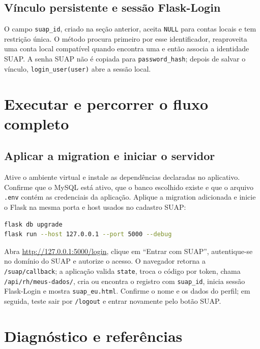 \documentclass[11pt,a4paper]{article}
\begin{document}
\subsection{Vínculo persistente e sessão Flask-Login}
O campo \texttt{suap\_id}, criado na seção anterior, aceita \texttt{NULL} para contas locais e tem restrição única. O método procura primeiro por esse identificador, reaproveita uma conta local compatível quando encontra uma e então associa a identidade SUAP. A senha SUAP não é copiada para \texttt{password\_hash}; depois de salvar o vínculo, \texttt{login\_user(user)} abre a sessão local.

\clearpage
\section{Executar e percorrer o fluxo completo}
\subsection{Aplicar a migration e iniciar o servidor}
Ative o ambiente virtual e instale as dependências declaradas no aplicativo. Confirme que o MySQL está ativo, que o banco escolhido existe e que o arquivo \texttt{.env} contém as credenciais da aplicação. Aplique a migration adicionada e inicie o Flask na mesma porta e host usados no cadastro SUAP:
\begin{lstlisting}[language=bash]
flask db upgrade
flask run --host 127.0.0.1 --port 5000 --debug
\end{lstlisting}
Abra \url{http://127.0.0.1:5000/login}, clique em “Entrar com SUAP”, autentique-se no domínio do SUAP e autorize o acesso. O navegador retorna a \texttt{/suap/callback}; a aplicação valida \texttt{state}, troca o código por token, chama \texttt{/api/rh/meus-dados/}, cria ou encontra o registro com \texttt{suap\_id}, inicia sessão Flask-Login e mostra \texttt{suap\_eu.html}. Confirme o nome e os dados do perfil; em seguida, teste sair por \texttt{/logout} e entrar novamente pelo botão SUAP.

\clearpage
\section{Diagnóstico e referências}
\end{document}
